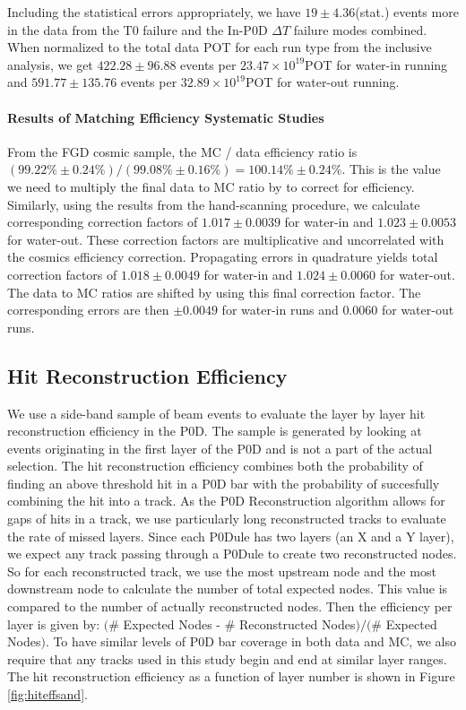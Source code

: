 Including the statistical errors appropriately, we have $19\pm 4.36$(stat.) events more in the data from the T0 failure and the In-P0D $\Delta T$ failure modes combined. When normalized to the total data POT for each run type from the inclusive analysis, we get $422.28 \pm 96.88$  events per $23.47\times 10^{19}$POT for water-in running and $591.77 \pm 135.76$  events per $32.89\times 10^{19}$POT for water-out running.

\paragraph{Results of Matching Efficiency Systematic Studies}
\label{sec:Systematics_MatchingEfficiencyResults}

From the FGD cosmic sample, the MC / data efficiency ratio is $(99.22\%\pm 0.24\%) / (99.08\%\pm 0.16\%) = 100.14\%\pm 0.24\%$. This is the value we need to multiply the final data to MC ratio by to correct for efficiency. Similarly, using the results from the hand-scanning procedure, we calculate corresponding correction factors of $1.017 \pm 0.0039$ for water-in and $1.023 \pm 0.0053$ for water-out. These correction factors are multiplicative and uncorrelated with the cosmics efficiency correction. Propagating errors in quadrature yields total correction factors of $1.018 \pm 0.0049$ for water-in and $1.024 \pm 0.0060$ for water-out. The data to MC ratios are shifted by using this final correction factor. The corresponding errors are then $\pm 0.0049$ for water-in runs and $0.0060$ for water-out runs.


\subsection{Hit Reconstruction Efficiency}
\label{sec:Systematics_HitEfficiency}

We use a side-band sample of beam events to evaluate 
the layer by layer hit reconstruction efficiency in the P0D. The sample is generated by looking at events originating in the first layer of the P0D and is not a part of the actual selection. 
The hit reconstruction efficiency combines both the probability of finding an above threshold hit 
in a P0D bar with the probability of succesfully combining 
the hit into a track. 
As the P0D Reconstruction algorithm allows for gaps of hits in a track, 
we use particularly long reconstructed tracks to evaluate 
the rate of missed layers. 
Since each P0Dule has two layers (an X and a Y layer), 
we expect any track passing through a P0Dule to create 
two reconstructed nodes. 
So for each reconstructed track, we use the most upstream node 
and the most downstream node to calculate the number of total expected nodes. 
This value is compared to the number of actually reconstructed nodes. 
Then the efficiency per layer is given 
by: $($\# Expected Nodes - \# Reconstructed Nodes$)/($\# Expected Nodes$)$. 
To have similar levels of P0D bar coverage in both data and MC, 
we also require that any tracks used in this study begin and end at similar layer ranges. 
The hit reconstruction efficiency as a function of layer number 
is shown in Figure \ref{fig:hiteffsand}.

